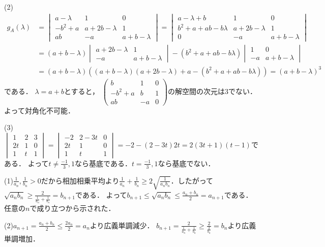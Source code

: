 \documentclass[
		book,
		head_space=20mm,
		foot_space=20mm,
		gutter=10mm,
		line_length=190mm
]{jlreq}
\begin{document}
(2)\begin{align}
	 g_A(\lambda)&=\begin{vmatrix}
a-\lambda&1&0\\
-b^2+a&a+2b-\lambda&1\\
ab&-a&a+b-\lambda
\end{vmatrix}=\begin{vmatrix}
a-\lambda+b&1&0\\
b^2+a+ab-b\lambda&a+2b-\lambda&1\\
0&-a&a+b-\lambda
\end{vmatrix}\\
&=(a+b-\lambda)\begin{vmatrix}
a+2b-\lambda&1\\
-a&a+b-\lambda
\end{vmatrix}-(b^2+a+ab-b\lambda)\begin{vmatrix}
1&0\\
-a&a+b-\lambda
\end{vmatrix}\\
&=(a+b-\lambda)((a+b-\lambda)(a+2b-\lambda)+a-(b^2+a+ab-b\lambda))=(a+b-\lambda)^3
\end{align}である．
$\lambda=a+b$とすると，
$\begin{pmatrix}
b&1&0\\
-b^2+a&b&1\\
ab&-a&0
\end{pmatrix}$の解空間の次元は$3$でない．
よって対角化不可能．

(3)
$\begin{vmatrix}
1&2&3\\
2t&1&0\\
1&t&1
\end{vmatrix}=\begin{vmatrix}
-2&2-3t&0\\
2t&1&0\\
1&t&1
\end{vmatrix}=-2-(2-3t)2t=2(3t+1)(t-1)$である．
よって$t\neq \frac{-1}{3},1$なら基底である．$t=\frac{-1}{3},1$なら基底でない．

(1)$\frac{1}{a_n},\frac{1}{b_n}>0$だから相加相乗平均より$\frac{1}{a_n}+\frac{1}{b_n}\ge 2\sqrt{\frac{1}{a_nb_n}}$．したがって$\sqrt{a_nb_n}\ge \frac{2}{\frac{1}{a_n}+\frac{1}{b_n}}=b_{n+1}$である．
よって$b_{n+1}\le \sqrt{a_nb_n}\le \frac{a_n+b_n}{2}=a_{n+1}$である．
任意の$n$で成り立つから示された．

(2)$a_{n+1}=\frac{a_n+b_n}{2}\le \frac{2a_n}{2}=a_n$より広義単調減少．
$b_{n+1}=\frac{2}{\frac{1}{a_n}+\frac{1}{b_n}}\ge\frac{2}{\frac{2}{b_n}}=b_n$より広義単調増加．
\end{document}
